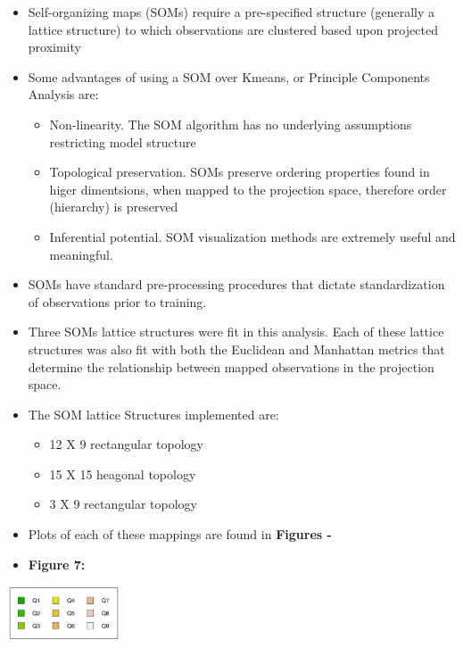 \documentclass[12pt,]{article}
\providecommand{\tightlist}{%
  \setlength{\itemsep}{0pt}\setlength{\parskip}{0pt}}
\begin{document}
\begin{itemize}
\item
  Self-organizing maps (SOMs) require a pre-specified structure
  (generally a lattice structure) to which observations are clustered
  based upon projected proximity
\item
  Some advantages of using a SOM over Kmeans, or Principle Components
  Analysis are:

  \begin{itemize}
  \tightlist
  \item
    Non-linearity. The SOM algorithm has no underlying assumptions
    restricting model structure
  \item
    Topological preservation. SOMs preserve ordering properties found in
    higer dimentsions, when mapped to the projection space, therefore
    order (hierarchy) is preserved
  \item
    Inferential potential. SOM visualization methods are extremely
    useful and meaningful.
  \end{itemize}
\item
  SOMs have standard pre-processing procedures that dictate
  standardization of observations prior to training.
\item
  Three SOMs lattice structures were fit in this analysis. Each of these
  lattice structures was also fit with both the Euclidean and Manhattan
  metrics that determine the relationship between mapped observations in
  the projection space.
\item
  The SOM lattice Structures implemented are:

  \begin{itemize}
  \tightlist
  \item
    12 X 9 rectangular topology
  \item
    15 X 15 heagonal topology
  \item
    3 X 9 rectangular topology
  \end{itemize}
\item
  Plots of each of these mappings are found in \textbf{Figures  - }
\item
  \textbf{Figure 7:}
\end{itemize}

\begin{center}
  \includegraphics[width=0.25\textwidth]{KeySom.jpeg}
\end{center}
\end{document}
